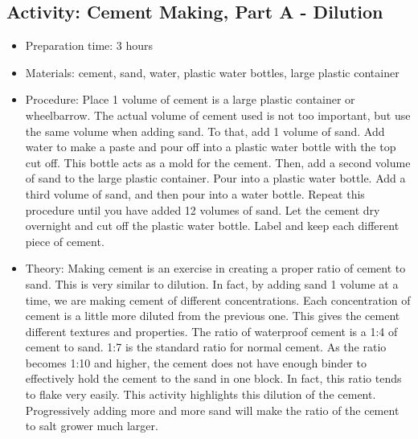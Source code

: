 \begin{itemize}
{\begin{itemize}
\subsection{Activity: Cement Making, Part A - Dilution}
\begin{itemize}
\item{Preparation time: 3 hours}
\item{Materials: cement, sand, water, plastic water bottles, large plastic container}
\item{Procedure: Place 1 volume of cement is a large plastic container or wheelbarrow. The actual volume of cement used is not too important, but use the same volume when adding sand. To that, add 1 volume of sand. Add water to make a paste and pour off into a plastic water bottle with the top cut off. This bottle acts as a mold for the cement. Then, add a second volume of sand to the large plastic container. Pour into a plastic water bottle. Add a third volume of sand, and then pour into a water bottle. Repeat this procedure until you have added 12 volumes of sand. Let the cement dry overnight and cut off the plastic water bottle. Label and keep each different piece of cement.}
\item{Theory: Making cement is an exercise in creating a proper ratio of cement to sand. This is very similar to dilution. In fact, by adding sand 1 volume at a time, we are making cement of different concentrations. Each concentration of cement is a little more diluted from the previous one. This gives the cement different textures and properties. The ratio of waterproof cement is a 1:4 of cement to sand. 1:7 is the standard ratio for normal cement. As the ratio becomes 1:10 and higher, the cement does not have enough binder to effectively hold the cement to the sand in one block. In fact, this ratio tends to flake very easily. This activity highlights this dilution of the cement. Progressively adding more and more sand will make the ratio of the cement to salt grower much larger.}
\end{itemize}


\end{itemize}}
\end{itemize}

